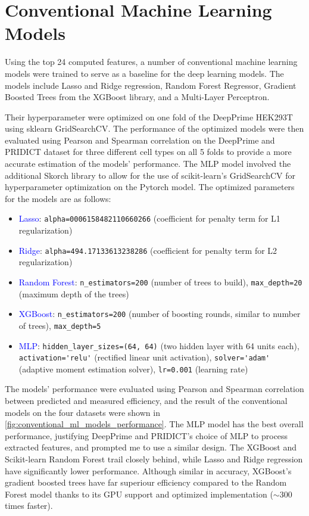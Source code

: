\section{Conventional Machine Learning Models}

Using the top 24 computed features, a number of conventional machine learning models were trained to serve as a baseline for the deep learning models. The models include Lasso and Ridge regression, Random Forest Regressor, Gradient Boosted Trees from the XGBoost library, and a Multi-Layer Perceptron. 

Their hyperparameter were optimized on one fold of the DeepPrime HEK293T using sklearn GridSearchCV. The performance of the optimized models were then evaluated using Pearson and Spearman correlation on the DeepPrime and PRIDICT dataset for three different cell types on all 5 folds to provide a more accurate estimation of the models' performance. The MLP model involved the additional Skorch library to allow for the use of scikit-learn's GridSearchCV for hyperparameter optimization on the Pytorch model. The optimized parameters for the models are as follows:

\begin{itemize}[itemsep=-0mm]
    \item \textcolor{blue}{Lasso}: \verb|alpha=0006158482110660266| (coefficient for penalty term for L1 regularization)
    \item \textcolor{blue}{Ridge}: \verb|alpha=494.17133613238286| (coefficient for penalty term for L2 regularization)
    \item \textcolor{blue}{Random Forest}: \verb|n_estimators=200| (number of trees to build), \verb|max_depth=20| (maximum depth of the trees)
    \item \textcolor{blue}{XGBoost}: \verb|n_estimators=200| (number of boosting rounds, similar to number of trees), \verb|max_depth=5| 
    \item \textcolor{blue}{MLP}: \verb|hidden_layer_sizes=(64, 64)| (two hidden layer with 64 units each), \verb|activation='relu'| (rectified linear unit activation), \verb|solver='adam'| (adaptive moment estimation solver), \verb|lr=0.001| (learning rate)
\end{itemize}

The models' performance were evaluated using Pearson and Spearman correlation between predicted and measured efficiency, and the result of the conventional models on the four datasets were shown in \autoref{fig:conventional_ml_models_performance}. The MLP model has the best overall performance, justifying DeepPrime and PRIDICT's choice of MLP to process extracted features, and prompted me to use a similar design. The XGBoost and Scikit-learn Random Forest trail closely behind, while Lasso and Ridge regression have significantly lower performance. Although similar in accuracy, XGBoost's gradient boosted trees have far superiour efficiency compared to the Random Forest model thanks to its GPU support and optimized implementation ($\sim$300 times faster).

